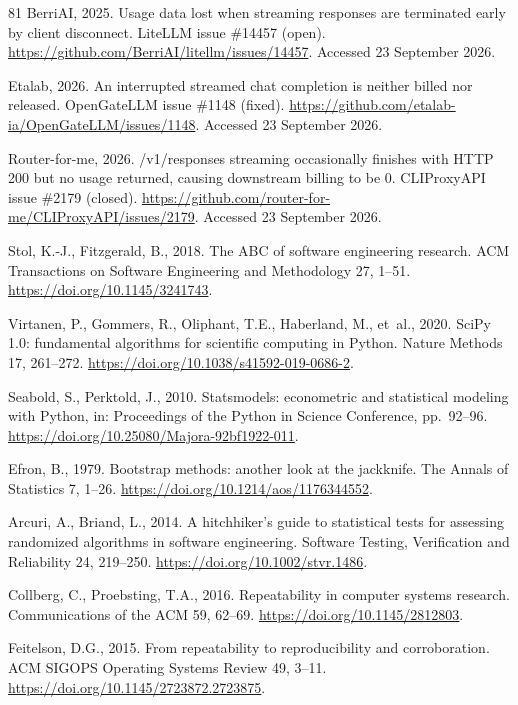 \documentclass[final,5p,times,twocolumn,number]{elsarticle}
\begin{document}
\begin{thebibliography}{81}
BerriAI, 2025. Usage data lost when streaming responses are terminated early by client
disconnect. LiteLLM issue \#14457 (open).
\url{https://github.com/BerriAI/litellm/issues/14457}. Accessed 23 September 2026.

Etalab, 2026. An interrupted streamed chat completion is neither billed nor released.
OpenGateLLM issue \#1148 (fixed).
\url{https://github.com/etalab-ia/OpenGateLLM/issues/1148}. Accessed 23 September 2026.

Router-for-me, 2026. /v1/responses streaming occasionally finishes with HTTP 200 but no
usage returned, causing downstream billing to be 0. CLIProxyAPI issue \#2179 (closed).
\url{https://github.com/router-for-me/CLIProxyAPI/issues/2179}. Accessed 23 September 2026.

Stol, K.-J., Fitzgerald, B., 2018. The ABC of software engineering research. ACM Transactions on Software Engineering and Methodology 27, 1--51. \url{https://doi.org/10.1145/3241743}.

Virtanen, P., Gommers, R., Oliphant, T.E., Haberland, M., et~al., 2020. SciPy 1.0: fundamental algorithms for scientific computing in Python. Nature Methods 17, 261--272. \url{https://doi.org/10.1038/s41592-019-0686-2}.

Seabold, S., Perktold, J., 2010. Statsmodels: econometric and statistical modeling with Python, in: Proceedings of the Python in Science Conference, pp.~92--96. \url{https://doi.org/10.25080/Majora-92bf1922-011}.

Efron, B., 1979. Bootstrap methods: another look at the jackknife. The Annals of Statistics 7, 1--26. \url{https://doi.org/10.1214/aos/1176344552}.

Arcuri, A., Briand, L., 2014. A hitchhiker's guide to statistical tests for assessing randomized algorithms in software engineering. Software Testing, Verification and Reliability 24, 219--250. \url{https://doi.org/10.1002/stvr.1486}.

Collberg, C., Proebsting, T.A., 2016. Repeatability in computer systems research. Communications of the ACM 59, 62--69. \url{https://doi.org/10.1145/2812803}.

Feitelson, D.G., 2015. From repeatability to reproducibility and corroboration. ACM SIGOPS Operating Systems Review 49, 3--11. \url{https://doi.org/10.1145/2723872.2723875}.


\end{thebibliography}
\end{document}
